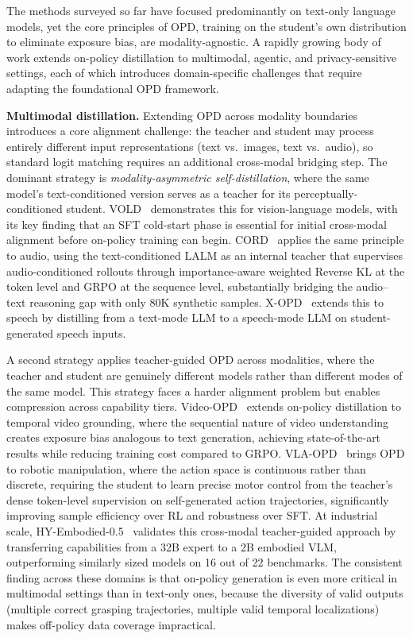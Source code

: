 \documentclass{article} %
\begin{document}
The methods surveyed so far have focused predominantly on text-only language models, yet the core principles of OPD, training on the student's own distribution to eliminate exposure bias, are modality-agnostic. A rapidly growing body of work extends on-policy distillation to multimodal, agentic, and privacy-sensitive settings, each of which introduces domain-specific challenges that require adapting the foundational OPD framework.

\textbf{Multimodal distillation.}
Extending OPD across modality boundaries introduces a core alignment challenge: the teacher and student may process entirely different input representations (text vs.\ images, text vs.\ audio), so standard logit matching requires an additional cross-modal bridging step. The dominant strategy is \emph{modality-asymmetric self-distillation}, where the same model's text-conditioned version serves as a teacher for its perceptually-conditioned student. VOLD~\citep{2510.23497} demonstrates this for vision-language models, with its key finding that an SFT cold-start phase is essential for initial cross-modal alignment before on-policy training can begin. CORD~\citep{hu2026cord} applies the same principle to audio, using the text-conditioned LALM as an internal teacher that supervises audio-conditioned rollouts through importance-aware weighted Reverse KL at the token level and GRPO at the sequence level, substantially bridging the audio--text reasoning gap with only 80K synthetic samples. X-OPD~\citep{2603.24596} extends this to speech by distilling from a text-mode LLM to a speech-mode LLM on student-generated speech inputs.

A second strategy applies teacher-guided OPD across modalities, where the teacher and student are genuinely different models rather than different modes of the same model. This strategy faces a harder alignment problem but enables compression across capability tiers. Video-OPD~\citep{2602.02994} extends on-policy distillation to temporal video grounding, where the sequential nature of video understanding creates exposure bias analogous to text generation, achieving state-of-the-art results while reducing training cost compared to GRPO. VLA-OPD~\citep{zhong2026vlaopd} brings OPD to robotic manipulation, where the action space is continuous rather than discrete, requiring the student to learn precise motor control from the teacher's dense token-level supervision on self-generated action trajectories, significantly improving sample efficiency over RL and robustness over SFT. At industrial scale, HY-Embodied-0.5~\citep{tencent2026hyembodied} validates this cross-modal teacher-guided approach by transferring capabilities from a 32B expert to a 2B embodied VLM, outperforming similarly sized models on 16 out of 22 benchmarks. The consistent finding across these domains is that on-policy generation is even more critical in multimodal settings than in text-only ones, because the diversity of valid outputs (multiple correct grasping trajectories, multiple valid temporal localizations) makes off-policy data coverage impractical.
\end{document}

